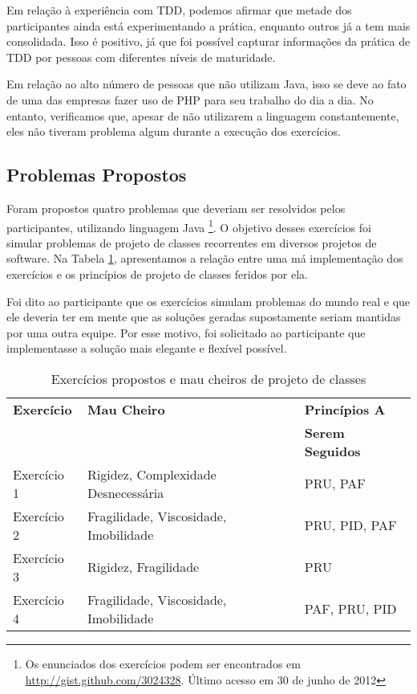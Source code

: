 \documentclass[conference]{IEEEtran}
\begin{document}
Em relação à experiência com TDD,
podemos afirmar que metade dos participantes ainda está experimentando a prática, enquanto
outros já a tem mais consolidada. Isso é positivo, já que foi possível capturar informações
da prática de TDD por pessoas com diferentes níveis de maturidade.

Em relação ao alto número de pessoas que não utilizam Java, isso se deve ao fato de uma das
empresas fazer uso de PHP para seu trabalho do dia a dia. No entanto,
verificamos que, apesar de não utilizarem a linguagem constantemente, eles não tiveram
problema algum durante a execução dos exercícios.

\subsection{Problemas Propostos}
\label{sec:exercicios}

Foram propostos quatro problemas que deveriam ser resolvidos pelos participantes, utilizando
linguagem Java \footnote{Os enunciados dos exercícios podem ser encontrados 
em \url{http://gist.github.com/3024328}. Último acesso em 30 de junho de 2012}. 
O objetivo desses exercícios foi simular problemas de projeto de classes 
recorrentes em diversos projetos de software. 
Na Tabela \ref{tab:problemas-exercicios}, apresentamos a relação entre uma má
implementação dos exercícios e os princípios de projeto de classes feridos por
ela.

Foi dito ao participante que os exercícios simulam problemas do mundo real e que ele deveria
ter em mente que as soluções geradas supostamente seriam mantidas por uma outra equipe.
Por esse motivo, foi solicitado ao participante que implementasse a solução mais elegante e flexível 
possível.

\begin{table}
	\centering
	\begin{tabular}{| l | l | l | }
		\hline
		\textbf{Exercício} & \textbf{Mau Cheiro} & \textbf{Princípios A}\\
		& & \textbf{Serem Seguidos}\\
		
		\hline
		
		Exercício 1 & Rigidez, Complexidade Desnecessária & PRU, PAF \\
		Exercício 2 & Fragilidade, Viscosidade, Imobilidade & PRU, PID, PAF \\
		Exercício 3 & Rigidez, Fragilidade & PRU\\
		Exercício 4 & Fragilidade, Viscosidade, Imobilidade & PAF, PRU, PID \\
		
		\hline
	\end{tabular}
	\caption{Exercícios propostos e mau cheiros de projeto de classes}
	\label{tab:problemas-exercicios}
\end{table}
\end{document}
